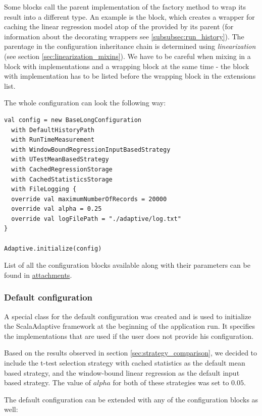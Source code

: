  Some blocks call the parent implementation of the factory method to wrap its result into a different type. An example is the  block, which creates a wrapper for caching the linear regression model atop of the  provided by its parent (for information about the decorating wrappers see \ref{subsubsec:run_history}). The parentage in the configuration inheritance chain is determined using \textit{linearization} (see section \ref{sec:linearization_mixins}). We have to be careful when mixing in a block with implementations and a wrapping block at the same time - the block with implementation has to be listed before the wrapping block in the extensions list.
 
 The whole configuration can look the following way:

\lstset{style=Scala}
\begin{lstlisting}
val config = new BaseLongConfiguration
  with DefaultHistoryPath
  with RunTimeMeasurement
  with WindowBoundRegressionInputBasedStrategy
  with UTestMeanBasedStrategy
  with CachedRegressionStorage
  with CachedStatisticsStorage
  with FileLogging {
  override val maximumNumberOfRecords = 20000
  override val alpha = 0.25
  override val logFilePath = "./adaptive/log.txt"
}

Adaptive.initialize(config)
\end{lstlisting}

List of all the configuration blocks available along with their parameters can be found in \hyperref[attach:config_blocks]{attachments}.

\subsubsection{Default configuration}

A special class for the default configuration was created and is used to initialize the ScalaAdaptive framework at the beginning of the application run. It specifies the implementations that are used if the user does not provide his configuration.

Based on the results observed in section \ref{sec:strategy_comparison}, we decided to include the t-test selection strategy with cached statistics as the default mean based strategy, and the window-bound linear regression as the default input based strategy. The value of $alpha$ for both of these strategies was set to $0.05$.

The default configuration can be extended with any of the configuration blocks as well:

